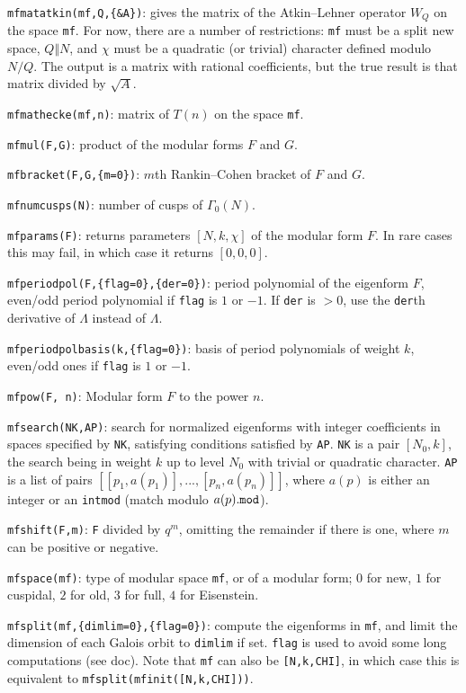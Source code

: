 \documentclass[11pt]{article}
\newcommand{\G}{\Gamma}
\def\kbd#1{{\tt #1}}
\begin{document}
\kbd{mfmatatkin(mf,Q,\{\&A\})}: gives the matrix of the Atkin--Lehner operator
$W_Q$ on the space \kbd{mf}. For now, there are a number of restrictions:
\kbd{mf} must be a split new space, $Q\Vert N$, and $\chi$ must be a quadratic
(or trivial) character defined modulo $N/Q$. The output is a matrix with
rational coefficients, but the true result is that matrix divided by
$\sqrt{A}$.

\kbd{mfmathecke(mf,n)}: matrix of $T(n)$ on the space \kbd{mf}.

\kbd{mfmul(F,G)}: product of the modular forms $F$ and $G$.

\kbd{mfbracket(F,G,\{m=0\})}: $m$th Rankin--Cohen bracket of $F$ and $G$.

\kbd{mfnumcusps(N)}: number of cusps of $\G_0(N)$.

\kbd{mfparams(F)}: returns parameters $[N,k,\chi]$ of the modular form $F$.
In rare cases this may fail, in which case it returns $[0,0,0]$.

\kbd{mfperiodpol(F,\{flag=0\},\{der=0\})}: period polynomial of the eigenform
$F$, even/odd period polynomial if \kbd{flag} is $1$ or $-1$. If \kbd{der}
is $>0$, use the \kbd{der}th derivative of $\Lambda$ instead of $\Lambda$.

\kbd{mfperiodpolbasis(k,\{flag=0\})}: basis of period polynomials of weight
$k$, even/odd ones if \kbd{flag} is $1$ or $-1$.

\kbd{mfpow(F, n)}: Modular form $F$ to the power $n$.

\kbd{mfsearch(NK,AP)}: search for normalized eigenforms with
integer coefficients in spaces specified by \kbd{NK}, satisfying conditions
satisfied by \kbd{AP}. \kbd{NK} is a pair $[N_0,k]$, the search being in
weight $k$ up to level $N_0$ with trivial or quadratic character.
\kbd{AP} is a list of pairs $[[p_1,a(p_1)],...,[p_n,a(p_n)]]$, where $a(p)$
is either an integer or an \kbd{intmod} (match modulo $a(p)\kbd{.mod}$).

\kbd{mfshift(F,m)}: \kbd{F} divided by $q^m$, omitting the remainder if there
is one, where $m$ can be positive or negative.

\kbd{mfspace(mf)}: type of modular space \kbd{mf}, or of a modular form;
$0$ for new, $1$ for cuspidal, $2$ for old, $3$ for full, $4$ for Eisenstein.

\kbd{mfsplit(mf,\{dimlim=0\},\{flag=0\})}: compute the eigenforms in \kbd{mf},
and limit the dimension of each Galois orbit to \kbd{dimlim} if set.
\kbd{flag} is used to avoid some long computations (see doc). Note that
\kbd{mf} can also be \kbd{[N,k,CHI]}, in which case this is equivalent to
\kbd{mfsplit(mfinit([N,k,CHI]))}.
\end{document}
